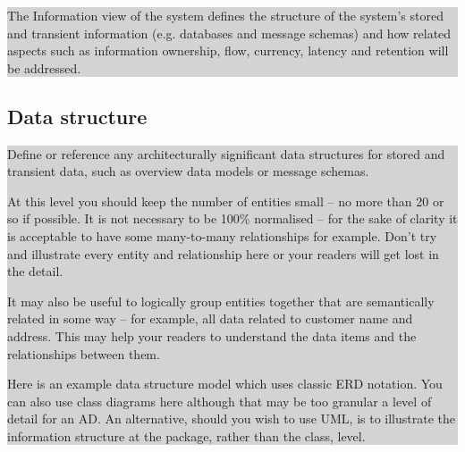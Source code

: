 \documentclass[a4paper,11pt]{report}
\newcommand{\instructions}[1]{
  \noindent\colorbox{lightgray}{%
    \parbox{\linewidth}{%
      #1
    }%
  }%
 \vspace{0.1cm}
}
\begin{document}
\instructions{
The Information view of the system defines the structure of the
system’s stored and transient information (e.g. databases and message
schemas) and how related aspects such as information ownership, flow,
currency, latency and retention will be addressed.
}

\subsection{Data structure}
\label{sec:data-structure}

\instructions{
Define or reference any architecturally significant data structures
for stored and transient data, such as overview data models or message
schemas.

At this level you should keep the number of entities small – no more
than 20 or so if possible. It is not necessary to be 100\% normalised
– for the sake of clarity it is acceptable to have some many-to-many
relationships for example. Don’t try and illustrate every entity and
relationship here or your readers will get lost in the detail.

It may also be useful to logically group entities together that are
semantically related in some way – for example, all data related to
customer name and address. This may help your readers to understand
the data items and the relationships between them.

Here is an example data structure model which uses classic ERD
notation. You can also use class diagrams here although that may be
too granular a level of detail for an AD. An alternative, should you
wish to use UML, is to illustrate the information structure at the
package, rather than the class, level.

}
\end{document}
